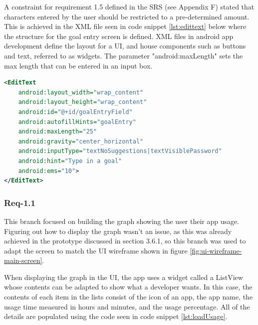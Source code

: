 \documentclass[12pt]{article}
\begin{document}
A constraint for requirement 1.5 defined in the SRS (see Appendix F) stated that characters entered by the user should be restricted to a pre-determined amount. This is achieved in the XML file seen
in code snippet \ref{lst:edittext} below where the structure for the goal entry screen is defined. XML files in android app development define the layout for a UI, and house components such as
buttons and text, referred to as widgets.  The parameter "android:maxLength" sets the max length that can be entered in an input box.

\begin{lstlisting}[language=XML, style=mystyle, caption={XML code for the EditText widget}, label=lst:edittext]
 <EditText
	android:layout_width="wrap_content"
	android:layout_height="wrap_content"
	android:id="@+id/goalEntryField"
	android:autofillHints="goalEntry"
	android:maxLength="25"
	android:gravity="center_horizontal"
	android:inputType="textNoSuggestions|textVisiblePassword"
	android:hint="Type in a goal"
	android:ems="10">
</EditText>
\end{lstlisting}

\subsubsection{Req-1.1}
This branch focused on building the graph showing the user their app usage. Figuring out how to display the graph wasn't an issue, as this was already achieved in the prototype discussed in 
section 3.6.1, so this branch was used to adapt the screen to match the UI wireframe shown in figure \ref{fig:ui-wireframe-main-screen}. \newline

When displaying the graph in the UI, the app uses a widget called a ListView whose contents can be adapted to show what a developer wants. In this case, the contents of each item in the lists 
consist of the icon of an app, the app name, the usage time measured in hours and minutes, and the usage percentage. All of the details are populated using the code seen in code snippet
\ref{lst:loadUsage}.
\end{document}
